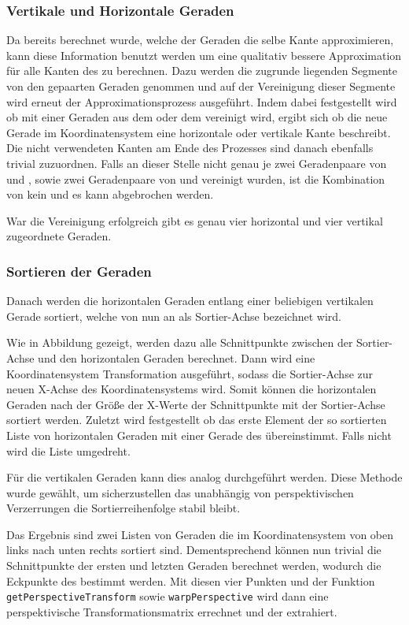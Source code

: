 \subsubsection{Vertikale und Horizontale Geraden}
Da bereits berechnet wurde, welche der Geraden die selbe Kante approximieren, kann diese Information benutzt werden um eine qualitativ bessere Approximation für alle Kanten des \olfp zu berechnen. Dazu werden die zugrunde liegenden Segmente von den gepaarten Geraden genommen und auf der Vereinigung dieser Segmente wird erneut der Approximationsprozess ausgeführt. Indem dabei festgestellt wird ob mit einer Geraden aus dem \orfp oder dem \ulfp vereinigt wird, ergibt sich ob die neue Gerade im \QRCode Koordinatensystem eine horizontale oder vertikale Kante beschreibt. Die nicht verwendeten Kanten am Ende des Prozesses sind danach ebenfalls trivial zuzuordnen. Falls an dieser Stelle nicht genau je zwei Geradenpaare von \olfp und \orfp, sowie zwei Geradenpaare von \olfp und \orfp vereinigt wurden, ist die Kombination von \fps kein \QRCode und es kann abgebrochen werden.

War die Vereinigung erfolgreich gibt es genau vier horizontal und vier vertikal zugeordnete Geraden.

\subsubsection{Sortieren der Geraden}
Danach werden die horizontalen Geraden entlang einer beliebigen vertikalen Gerade sortiert, welche von nun an als Sortier-Achse bezeichnet wird. 

Wie in Abbildung  gezeigt, werden dazu alle Schnittpunkte zwischen der Sortier-Achse und den horizontalen Geraden berechnet. Dann wird eine Koordinatensystem Transformation ausgeführt, sodass die Sortier-Achse zur neuen X-Achse des Koordinatensystems wird. Somit können die horizontalen Geraden nach der Größe der X-Werte der Schnittpunkte mit der Sortier-Achse sortiert werden. Zuletzt wird festgestellt ob das erste Element der so sortierten Liste von horizontalen Geraden mit einer Gerade des \olfp übereinstimmt. Falls nicht wird die Liste umgedreht.

Für die vertikalen Geraden kann dies analog durchgeführt werden. Diese Methode wurde gewählt, um sicherzustellen das unabhängig von perspektivischen Verzerrungen die Sortierreihenfolge stabil bleibt.

Das Ergebnis sind zwei Listen von Geraden die im \QRCode Koordinatensystem von oben links nach unten rechts sortiert sind. Dementsprechend können nun trivial die Schnittpunkte der ersten und letzten Geraden berechnet werden, wodurch die Eckpunkte des \QRCodes bestimmt werden. Mit diesen vier Punkten und der \OpenCV Funktion  \texttt{getPerspectiveTransform} sowie \texttt{warpPerspective} wird dann eine perspektivische Transformationsmatrix errechnet und der \QRCode extrahiert. 